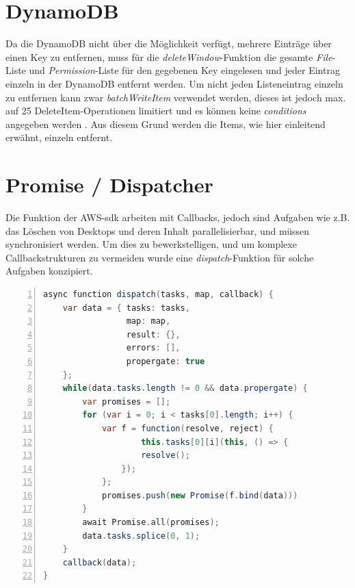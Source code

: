 \documentclass[a4paper, 12pt]{scrreprt}
\renewcommand\_{\textunderscore\allowbreak}
\begin{document}
\section{DynamoDB}
Da die DynamoDB nicht über die Möglichkeit verfügt, mehrere Einträge über einen Key zu entfernen, muss für die \textit{deleteWindow}-Funktion die gesamte \textit{File}-Liste und \textit{Permission}-Liste für den gegebenen Key eingelesen und jeder Eintrag einzeln in der DynamoDB entfernt werden.
Um nicht jeden Listeneintrag einzeln zu entfernen kann zwar \textit{batchWriteItem} verwendet werden, dieses ist jedoch max. auf 25 DeleteItem-Operationen limitiert und es können keine \textit{conditions} angegeben werden \cite{AWSJSSDKD}. Aus diesem Grund werden die Items, wie hier einleitend erwähnt, einzeln entfernt.


\section{Promise / Dispatcher}


Die Funktion der AWS-sdk arbeiten mit Callbacks, jedoch sind Aufgaben wie z.B. das Löschen von Desktops und deren Inhalt parallelisierbar, und müssen synchronisiert werden. Um dies zu bewerkstelligen, und um komplexe Callbackstrukturen zu vermeiden wurde eine \textit{dispatch}-Funktion für solche Aufgaben konzipiert. 

\begin{lstlisting}[xleftmargin=\parindent,numbers=left,numberstyle=\small,numbersep=8pt,frame=L,mathescape=true, basicstyle=\small, language=Java, lineskip={1.0pt}]
async function dispatch(tasks, map, callback) {
    var data = { tasks: tasks,
                 map: map, 
                 result: {}, 
                 errors: [], 
                 propergate: true 
    };
    while(data.tasks.length != 0 && data.propergate) {
        var promises = [];
        for (var i = 0; i < tasks[0].length; i++) {
            var f = function(resolve, reject) {
                    this.tasks[0][i](this, () => {
                    resolve();
                });
            };
            promises.push(new Promise(f.bind(data)))
        }
        await Promise.all(promises);
        data.tasks.splice(0, 1);
    }
    callback(data);
}
\end{lstlisting}
\end{document}
